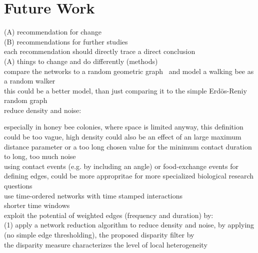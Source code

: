 \section{Future Work}
(A) recommendation for change\\
(B) recommendations for further studies\\
each recommendation should directly trace a direct conclusion\\


(A) things to change and do differently (methods)\\

compare the networks to a random geometric graph~\cite{rgg2002} and model a walking bee as a random walker\\
this could be a better model, than just comparing it to the simple Erdös-Reniy random graph\\


reduce density and noise:

especially in honey bee colonies, where space is limited anyway, this definition could be too vague, high density could also be an effect of an large maximum distance parameter or a too long chosen value for the minimum contact duration to long, too much noise\\

using contact events (e.g. by including an angle) or food-exchange events for defining edges, could be more appropritae for more specialized biological research questions\\

use time-ordered networks with time stamped interactions\\

shorter time windows\\


exploit the potential of weighted edges (frequency and duration) by:\\

(1) apply a network reduction algorithm to reduce density and noise, by applying (no simple edge thresholding), the proposed disparity filter by \textcite{serrano2009extracting}\\
the disparity measure characterizes the level of local heterogeneity~\cite{barthelemy2003spatial}

